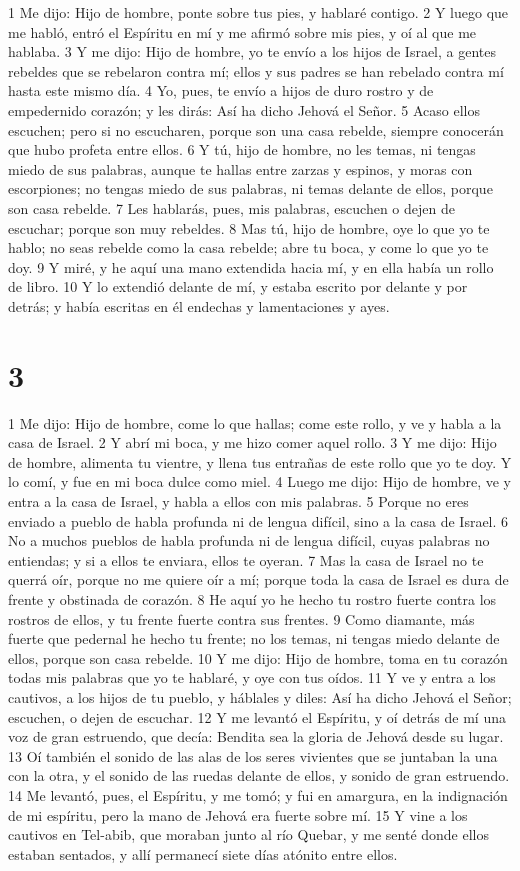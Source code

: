 1 Me dijo: Hijo de hombre, ponte sobre tus pies, y hablaré contigo.
2 Y luego que me habló, entró el Espíritu en mí y me afirmó sobre mis pies, y oí al que me hablaba.
3 Y me dijo: Hijo de hombre, yo te envío a los hijos de Israel, a gentes rebeldes que se rebelaron contra mí; ellos y sus padres se han rebelado contra mí hasta este mismo día.
4 Yo, pues, te envío a hijos de duro rostro y de empedernido corazón; y les dirás: Así ha dicho Jehová el Señor.
5 Acaso ellos escuchen; pero si no escucharen, porque son una casa rebelde, siempre conocerán que hubo profeta entre ellos.
6 Y tú, hijo de hombre, no les temas, ni tengas miedo de sus palabras, aunque te hallas entre zarzas y espinos, y moras con escorpiones; no tengas miedo de sus palabras, ni temas delante de ellos, porque son casa rebelde.
7 Les hablarás, pues, mis palabras, escuchen o dejen de escuchar; porque son muy rebeldes.
8 Mas tú, hijo de hombre, oye lo que yo te hablo; no seas rebelde como la casa rebelde; abre tu boca, y come lo que yo te doy.
9 Y miré, y he aquí una mano extendida hacia mí, y en ella había un rollo de libro.
10 Y lo extendió delante de mí, y estaba escrito por delante y por detrás; y había escritas en él endechas y lamentaciones y ayes.

\chapter{3}

1 Me dijo: Hijo de hombre, come lo que hallas; come este rollo, y ve y habla a la casa de Israel.
2 Y abrí mi boca, y me hizo comer aquel rollo.
3 Y me dijo: Hijo de hombre, alimenta tu vientre, y llena tus entrañas de este rollo que yo te doy. Y lo comí, y fue en mi boca dulce como miel. 
4 Luego me dijo: Hijo de hombre, ve y entra a la casa de Israel, y habla a ellos con mis palabras. 
5 Porque no eres enviado a pueblo de habla profunda ni de lengua difícil, sino a la casa de Israel.
6 No a muchos pueblos de habla profunda ni de lengua difícil, cuyas palabras no entiendas; y si a ellos te enviara, ellos te oyeran.
7 Mas la casa de Israel no te querrá oír, porque no me quiere oír a mí; porque toda la casa de Israel es dura de frente y obstinada de corazón.
8 He aquí yo he hecho tu rostro fuerte contra los rostros de ellos, y tu frente fuerte contra sus frentes.
9 Como diamante, más fuerte que pedernal he hecho tu frente; no los temas, ni tengas miedo delante de ellos, porque son casa rebelde.
10 Y me dijo: Hijo de hombre, toma en tu corazón todas mis palabras que yo te hablaré, y oye con tus oídos.
11 Y ve y entra a los cautivos, a los hijos de tu pueblo, y háblales y diles: Así ha dicho Jehová el Señor; escuchen, o dejen de escuchar.
12 Y me levantó el Espíritu, y oí detrás de mí una voz de gran estruendo, que decía: Bendita sea la gloria de Jehová desde su lugar.
13 Oí también el sonido de las alas de los seres vivientes que se juntaban la una con la otra, y el sonido de las ruedas delante de ellos, y sonido de gran estruendo.
14 Me levantó, pues, el Espíritu, y me tomó; y fui en amargura, en la indignación de mi espíritu, pero la mano de Jehová era fuerte sobre mí.
15 Y vine a los cautivos en Tel-abib, que moraban junto al río Quebar, y me senté donde ellos estaban sentados, y allí permanecí siete días atónito entre ellos.

